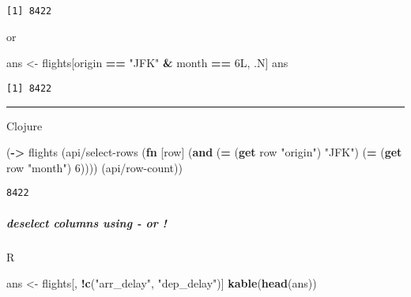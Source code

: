 \documentclass[]{article}
\newenvironment{Shaded}{\begin{snugshade}}{\end{snugshade}}
\newcommand{\KeywordTok}[1]{\textcolor[rgb]{0.13,0.29,0.53}{\textbf{#1}}}
\newcommand{\DecValTok}[1]{\textcolor[rgb]{0.00,0.00,0.81}{#1}}
\newcommand{\StringTok}[1]{\textcolor[rgb]{0.31,0.60,0.02}{#1}}
\newcommand{\OperatorTok}[1]{\textcolor[rgb]{0.81,0.36,0.00}{\textbf{#1}}}
\newcommand{\NormalTok}[1]{#1}
\let\oldsubparagraph\subparagraph
\renewcommand{\subparagraph}[1]{\oldsubparagraph{#1}\mbox{}}
\begin{document}
\begin{verbatim}
[1] 8422
\end{verbatim}

or

\begin{Shaded}
\begin{Highlighting}[]
\NormalTok{ans <-}\StringTok{ }\NormalTok{flights[origin }\OperatorTok{==}\StringTok{ "JFK"} \OperatorTok{&}\StringTok{ }\NormalTok{month }\OperatorTok{==}\StringTok{ }\NormalTok{6L, .N]}
\NormalTok{ans}
\end{Highlighting}
\end{Shaded}

\begin{verbatim}
[1] 8422
\end{verbatim}

\begin{center}\rule{0.5\linewidth}{0.5pt}\end{center}

Clojure

\begin{Shaded}
\begin{Highlighting}[]
\NormalTok{(}\KeywordTok{->}\NormalTok{ flights}
\NormalTok{    (api/select-rows (}\KeywordTok{fn}\NormalTok{ [row] (}\KeywordTok{and}\NormalTok{ (}\KeywordTok{=}\NormalTok{ (}\KeywordTok{get}\NormalTok{ row }\StringTok{"origin"}\NormalTok{) }\StringTok{"JFK"}\NormalTok{)}
\NormalTok{                                   (}\KeywordTok{=}\NormalTok{ (}\KeywordTok{get}\NormalTok{ row }\StringTok{"month"}\NormalTok{) }\DecValTok{6}\NormalTok{))))}
\NormalTok{    (api/row-count))}
\end{Highlighting}
\end{Shaded}

\begin{verbatim}
8422
\end{verbatim}

\subparagraph{deselect columns using - or
!}\label{deselect-columns-using---or}

R

\begin{Shaded}
\begin{Highlighting}[]
\NormalTok{ans <-}\StringTok{ }\NormalTok{flights[, }\OperatorTok{!}\KeywordTok{c}\NormalTok{(}\StringTok{"arr_delay"}\NormalTok{, }\StringTok{"dep_delay"}\NormalTok{)]}
\KeywordTok{kable}\NormalTok{(}\KeywordTok{head}\NormalTok{(ans))}
\end{Highlighting}
\end{Shaded}
\end{document}
